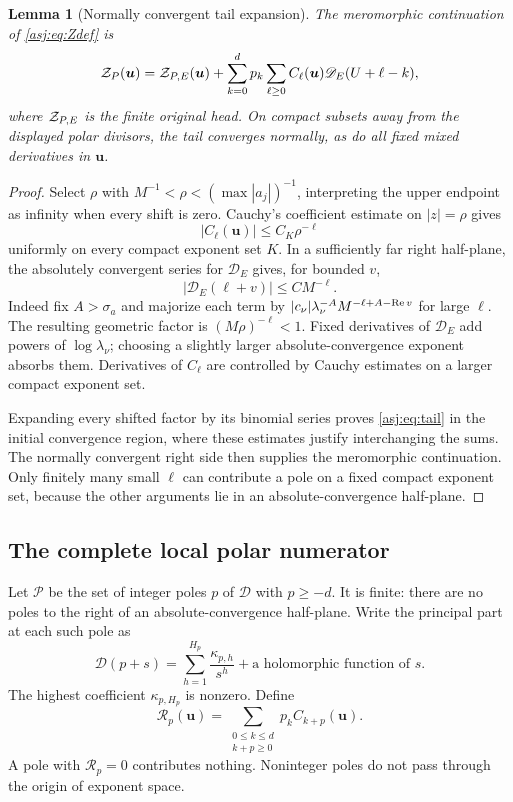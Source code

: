 \documentclass[11pt]{article}
\numberwithin{equation}{section}
\newtheorem{lemma}[theorem]{Lemma}
\theoremstyle{definition}\newtheorem{definition}[theorem]{Definition}
\theoremstyle{remark}\newtheorem{remark}[theorem]{Remark}\newtheorem{example}[theorem]{Example}
\newcommand{\D}{\mathscr D}\newcommand{\calH}{\mathcal H}\newcommand{\calR}{\mathcal R}
\begin{document}
\begin{lemma}[Normally convergent tail expansion]\label{asj:thm:tail}
The meromorphic continuation of \eqref{asj:eq:Zdef} is
\begin{equation}\label{asj:eq:tail}
 \calZ_P(\boldsymbol u)=
 \calZ_{P,E}(\boldsymbol u)
 +\sum_{k=0}^d p_k\sum_{\ell\ge0}
          C_\ell(\boldsymbol u)\D_E(U+\ell-k),
\end{equation}
where $\mathcal Z_{P,E}$ is the finite original head. On compact subsets away
from the displayed polar divisors, the tail converges normally, as do
all fixed mixed derivatives in $\boldsymbol u$.
\end{lemma}
\begin{proof}
Select $\rho$ with $M^{-1}<\rho<(\max|a_j|)^{-1}$, interpreting the upper
endpoint as infinity when every shift is zero. Cauchy's coefficient estimate
on $|z|=\rho$ gives
\[
 |C_\ell(\boldsymbol u)|\le C_K\rho^{-\ell}
\]
uniformly on every compact exponent set $K$. In a sufficiently far right
half-plane, the absolutely convergent series for $\D_E$ gives, for bounded $v$,
\[
 |\D_E(\ell+v)|\le C M^{-\ell}.
\]
Indeed fix $A>\sigma_a$ and majorize each term by
$|c_\nu|\lambda_\nu^{-A}M^{-\ell+A-\operatorname{Re} v}$ for large $\ell$.
The resulting geometric factor is $(M\rho)^{-\ell}<1$.
Fixed derivatives of $\D_E$ add powers of $\log\lambda_\nu$; choosing a
slightly larger absolute-convergence exponent absorbs them. Derivatives of
$C_\ell$ are controlled by Cauchy estimates on a larger compact exponent set.

Expanding every shifted factor by its binomial series proves
\eqref{asj:eq:tail} in the initial convergence region, where these estimates
justify interchanging the sums. The normally convergent right side then
supplies the meromorphic continuation. Only finitely many small $\ell$
can contribute a pole on a fixed compact exponent set, because the other
arguments lie in an absolute-convergence half-plane.
\end{proof}

\subsection{The complete local polar numerator}
Let $\mathcal P$ be the set of integer poles $p$ of $\D$ with $p\ge-d$.
It is finite: there are no poles to the right of an absolute-convergence
half-plane. Write the principal part at each such pole as
\begin{equation}\label{asj:eq:principal}
 \D(p+s)=\sum_{h=1}^{H_p}\frac{\kappa_{p,h}}{s^h}
                      +\text{a holomorphic function of }s.
\end{equation}
The highest coefficient $\kappa_{p,H_p}$ is nonzero. Define
\begin{equation}\label{asj:eq:Rdef}
 \calR_p(\boldsymbol u)=
       \sum_{\substack{0\le k\le d\\k+p\ge0}}p_k C_{k+p}(\boldsymbol u).
\end{equation}
A pole with $\calR_p=0$ contributes nothing. Noninteger poles do not pass
through the origin of exponent space.
\end{document}
